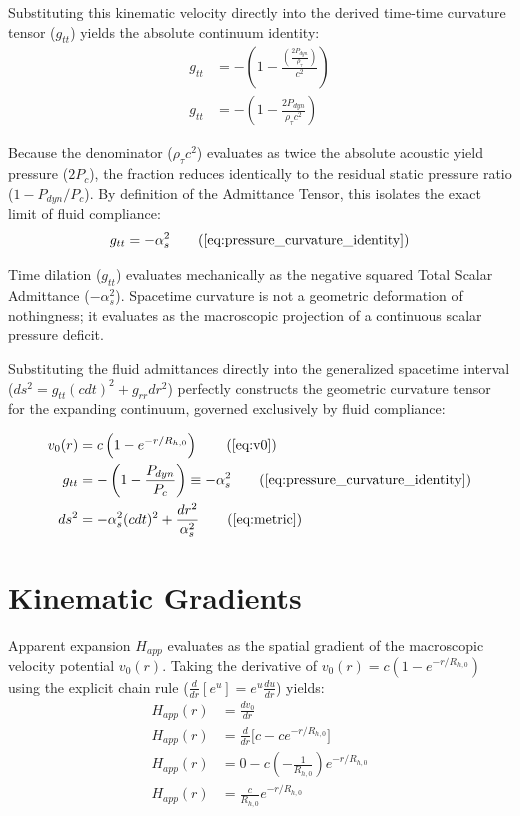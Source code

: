 \documentclass[11pt, a4paper]{article}
\begin{document}
Substituting this kinematic velocity directly into the derived time-time curvature tensor ($g_{tt}$) yields the absolute continuum identity:
\begin{align}
    g_{tt} &= -\left( 1 - \frac{\left( \frac{2 P_{dyn}}{\rho_{\tau}} \right)}{c^2} \right) \nonumber \\
    g_{tt} &= -\left( 1 - \frac{2 P_{dyn}}{\rho_{\tau} c^2} \right) \nonumber
\end{align}

Because the denominator ($\rho_{\tau} c^2$) evaluates as twice the absolute acoustic yield pressure ($2P_c$), the fraction reduces identically to the residual static pressure ratio ($1 - P_{dyn}/P_c$). By definition of the Admittance Tensor, this isolates the exact limit of fluid compliance:
\begin{equation}
    g_{tt} = -\alpha_s^2 \tag{\ref{eq:pressure_curvature_identity}}
\end{equation}

Time dilation ($g_{tt}$) evaluates mechanically as the negative squared Total Scalar Admittance ($-\alpha_s^2$). Spacetime curvature is not a geometric deformation of nothingness; it evaluates as the macroscopic projection of a continuous scalar pressure deficit. 

Substituting the fluid admittances directly into the generalized spacetime interval ($ds^2 = g_{tt} (c dt)^2 + g_{rr} dr^2$) perfectly constructs the geometric curvature tensor for the expanding continuum, governed exclusively by fluid compliance:

\begin{tcolorbox}[recallbox, title={\ref{box:gr_bridge}. The Geometric Spacetime Bridge}]
\begin{align}
    v_0(r) &= c\left(1-e^{-r/R_{h,0}}\right) \tag{\ref{eq:v0}} \\
    g_{tt} &= -\left( 1 - \frac{P_{dyn}}{P_c} \right) \equiv -\alpha_s^2 \tag{\ref{eq:pressure_curvature_identity}} \\
    ds^2 &= -\alpha_s^2(c dt)^2 + \frac{dr^2}{\alpha_s^2} \tag{\ref{eq:metric}}
\end{align}
\end{tcolorbox}

\section{Kinematic Gradients}
\label{sec:deriv_kinematic_gradients}
Apparent expansion $H_{app}$ evaluates as the spatial gradient of the macroscopic velocity potential $v_0(r)$. Taking the derivative of $v_0(r) = c(1 - e^{-r/R_{h,0}})$ using the explicit chain rule ($\frac{d}{dr}[e^u] = e^u \frac{du}{dr}$) yields:
\begin{align}
    H_{app}(r) &= \frac{dv_0}{dr} \\
    H_{app}(r) &= \frac{d}{dr} \Big[ c - c e^{-r/R_{h,0}} \Big] \\
    H_{app}(r) &= 0 - c \left( -\frac{1}{R_{h,0}} \right) e^{-r/R_{h,0}} \\
    H_{app}(r) &= \frac{c}{R_{h,0}} e^{-r/R_{h,0}}
\end{align}
\end{document}

